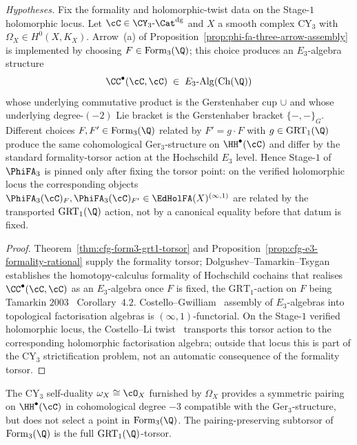 \begin{theorem}
\label{thm:cfg-e3-formality-stage-1-phiFA3-torsor}
\noindent\emph{Hypotheses.} Fix the formality and holomorphic-twist data on the Stage-$1$ holomorphic locus.
Let $\cC \in \CY_3\text{-}\Cat^{\mathrm{dg}}$ and $X$ a smooth complex CY$_3$ with $\Omega_X \in H^0(X, K_X)$. Arrow~\textup{(a)} of Proposition~\ref{prop:phi-fa-three-arrow-assembly} is implemented by choosing $F \in \mathrm{Form}_3(\Q)$; this choice produces an $E_3$-algebra structure
\[
 \CC^\bullet(\cC, \cC) \;\in\; E_3\text{-}\mathrm{Alg}(\mathrm{Ch}(\Q))
\]
whose underlying commutative product is the Gerstenhaber cup $\cup$ and whose underlying degree-$(-2)$ Lie bracket is the Gerstenhaber bracket $\{-, -\}_G$. Different choices $F, F' \in \mathrm{Form}_3(\Q)$ related by $F' = g \cdot F$ with $g \in \mathrm{GRT}_1(\Q)$ produce the same cohomological $\mathrm{Ger}_3$-structure on $\HH^\bullet(\cC)$ and differ by the standard formality-torsor action at the Hochschild $E_3$ level. Hence Stage-$1$ of $\PhiFA_3$ is pinned only after fixing the torsor point: on the verified holomorphic locus the corresponding objects $\PhiFA_3(\cC)_F, \PhiFA_3(\cC)_{F'} \in \EdHolFA(X)^{(\infty,1)}$ are related by the transported $\mathrm{GRT}_1(\Q)$ action, not by a canonical equality before that datum is fixed.
\end{theorem}

\begin{proof}
Theorem~\ref{thm:cfg-form3-grt1-torsor} and Proposition~\ref{prop:cfg-e3-formality-rational} supply the formality torsor; Dolgushev--Tamarkin--Tsygan~\cite{DolgushevTamarkinTsygan2010} establishes the homotopy-calculus formality of Hochschild cochains that realises $\CC^\bullet(\cC, \cC)$ as an $E_3$-algebra once $F$ is fixed, the $\mathrm{GRT}_1$-action on $F$ being Tamarkin $2003$~\cite{Tamarkin2007} Corollary~$4.2$. Costello--Gwilliam~\cite{CostelloGwilliam2017} assembly of $E_3$-algebras into topological factorisation algebras is $(\infty,1)$-functorial. On the Stage-$1$ verified holomorphic locus, the Costello--Li twist~\cite{CostelloLi2016,CostelloLi2020} transports this torsor action to the corresponding holomorphic factorisation algebra; outside that locus this is part of the CY$_3$ strictification problem, not an automatic consequence of the formality torsor.
\end{proof}

\begin{proposition}
\label{prop:cfg-cy3-self-duality-torsor-not-rigidified}
The CY$_3$ self-duality $\omega_X \cong \cO_X$ furnished by $\Omega_X$ provides a symmetric pairing on $\HH^\bullet(\cC)$ in cohomological degree $-3$ compatible with the $\mathrm{Ger}_3$-structure, but does not select a point in $\mathrm{Form}_3(\Q)$. The pairing-preserving subtorsor of $\mathrm{Form}_3(\Q)$ is the full $\mathrm{GRT}_1(\Q)$-torsor.
\end{proposition}

